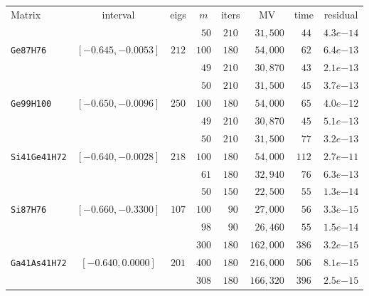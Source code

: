 \begin{tabular}{l|c|c|c|c|c|c|c}
\hline
\multirow{2}{*}{Matrix} & \multirow{2}{*}{interval} & \multirow{2}{*}{eigs} & \multirow{2}{*}{$m$} & \multirow{2}{*}{iters} & \multirow{2}{*}{MV} & \multirow{2}{*}{time} & \multirow{2}{*}{residual} \\
 & & & & & & & \\\hline
\hline
 & & & $\phantom{0}50$ & $210$ & $\phantom{0}31,500$ & $\phantom{0}44$ & $4.3e{-14}$ \\
\verb|Ge87H76| & $[-0.645,-0.0053]$ & $212$ & $100$ & $180$ & $\phantom{0}54,000$ & $\phantom{0}62$ & $6.4e{-13}$ \\
 & & & $\phantom{0}49$ & $210$ & $\phantom{0}30,870$ & $\phantom{0}43$ & $2.1e{-13}$ \\\hline
 & & & $\phantom{0}50$ & $210$ & $\phantom{0}31,500$ & $\phantom{0}45$ & $3.7e{-13}$ \\
\verb|Ge99H100| & $[-0.650,-0.0096]$ & $250$ & $100$ & $180$ & $\phantom{0}54,000$ & $\phantom{0}65$ & $4.0e{-12}$ \\
 & & & $\phantom{0}49$ & $210$ & $\phantom{0}30,870$ & $\phantom{0}45$ & $5.1e{-13}$ \\\hline
 & & & $\phantom{0}50$ & $210$ & $\phantom{0}31,500$ & $\phantom{0}77$ & $3.2e{-13}$ \\
\verb|Si41Ge41H72| & $[-0.640,-0.0028]$ & $218$ & $100$ & $180$ & $\phantom{0}54,000$ & $112$ & $2.7e{-11}$ \\
 & & & $\phantom{0}61$ & $180$ & $\phantom{0}32,940$ & $\phantom{0}76$ & $6.3e{-13}$ \\\hline
 & & & $\phantom{0}50$ & $150$ & $\phantom{0}22,500$ & $\phantom{0}55$ & $1.3e{-14}$ \\
\verb|Si87H76| & $[-0.660,-0.3300]$ & $107$ & $100$ & $\phantom{0}90$ & $\phantom{0}27,000$ & $\phantom{0}56$ & $3.3e{-15}$ \\
 & & & $\phantom{0}98$ & $\phantom{0}90$ & $\phantom{0}26,460$ & $\phantom{0}55$ & $1.5e{-14}$ \\\hline
 & & & $300$ & $180$ & $162,000$ & $386$ & $3.2e{-15}$ \\
\verb|Ga41As41H72| & $[-0.640,0.0000]$ & $201$ & $400$ & $180$ & $216,000$ & $506$ & $8.1e{-15}$ \\
 & & & $308$ & $180$ & $166,320$ & $396$ & $2.5e{-15}$ \\\hline
\end{tabular}